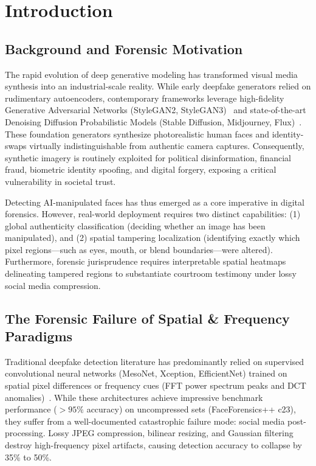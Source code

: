 \documentclass[12pt,a4paper]{report}
\begin{document}
\chapter{Introduction}

\section{Background and Forensic Motivation}
The rapid evolution of deep generative modeling has transformed visual media synthesis into an industrial-scale reality. While early deepfake generators relied on rudimentary autoencoders, contemporary frameworks leverage high-fidelity Generative Adversarial Networks (StyleGAN2, StyleGAN3)~\cite{karras2019style} and state-of-the-art Denoising Diffusion Probabilistic Models (Stable Diffusion, Midjourney, Flux)~\cite{rombach2022high}. These foundation generators synthesize photorealistic human faces and identity-swaps virtually indistinguishable from authentic camera captures. Consequently, synthetic imagery is routinely exploited for political disinformation, financial fraud, biometric identity spoofing, and digital forgery, exposing a critical vulnerability in societal trust.

Detecting AI-manipulated faces has thus emerged as a core imperative in digital forensics. However, real-world deployment requires two distinct capabilities: (1) global authenticity classification (deciding whether an image has been manipulated), and (2) spatial tampering localization (identifying exactly which pixel regions---such as eyes, mouth, or blend boundaries---were altered). Furthermore, forensic jurisprudence requires interpretable spatial heatmaps delineating tampered regions to substantiate courtroom testimony under lossy social media compression.

\section{The Forensic Failure of Spatial \& Frequency Paradigms}
Traditional deepfake detection literature has predominantly relied on supervised convolutional neural networks (MesoNet, Xception, EfficientNet) trained on spatial pixel differences or frequency cues (FFT power spectrum peaks and DCT anomalies)~\cite{rossler2019faceforensics,frank2020leveraging}. While these architectures achieve impressive benchmark performance ($>95\%$ accuracy) on uncompressed sets (FaceForensics++ c23), they suffer from a well-documented catastrophic failure mode: social media post-processing. Lossy JPEG compression, bilinear resizing, and Gaussian filtering destroy high-frequency pixel artifacts, causing detection accuracy to collapse by 35\% to 50\%.
\end{document}
